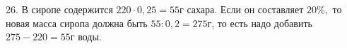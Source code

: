 26. В сиропе содержится $220\cdot0,25=55$г сахара. Если он составляет $20\%,$ то новая масса сиропа должна быть $55:0,2=275$г, то есть надо добавить $275-220=55$г воды.\\
